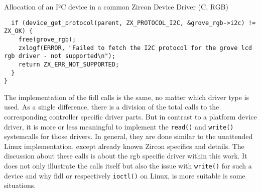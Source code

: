 \begin{listing}[H]
\caption{Allocation of an I²C device in a common Zircon Device Driver (C, RGB)}
\label{lst:i2calloccomm}
\begin{verbatim}
  if (device_get_protocol(parent, ZX_PROTOCOL_I2C, &grove_rgb->i2c) != ZX_OK) {
    free(grove_rgb);
    zxlogf(ERROR, "Failed to fetch the I2C protocol for the grove lcd rgb driver - not supported\n");
    return ZX_ERR_NOT_SUPPORTED;
  }
}
\end{verbatim}
\end{listing}

The implementation of the \ac{fidl} calls is the same, no matter which driver type is used.
As a single difference, there is a division of the total calls to the corresponding controller specific driver parts.
But in contrast to a platform device driver, it is more or less meaningful to implement the \texttt{read()} and \texttt{write()} systemcalls for those drivers.
In general, they are done similar to the unattended Linux implementation, except already known Zircon specifics and details.
The discussion about these calls is about the \ac{rgb} specific driver within this work.
It does not only illustrate the calls itself but also the issue with \texttt{write()} for such a device and why \ac{fidl} or respectively \texttt{ioctl()} on Linux, is more suitable is some situations.

